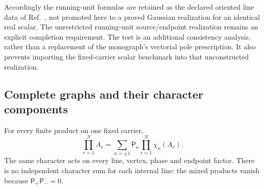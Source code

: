 \documentclass[final,5p,times,twocolumn,numbers,nopreprintline]{elsarticle}
\numberwithin{equation}{section}
\theoremstyle{definition}
\theoremstyle{remark}
\begin{document}
Accordingly the running-unit formulas are retained as the declared
oriented line data of Ref.~\cite{ChiapponeMonograph}, not promoted
here to a proved Gaussian realization for an identical real scalar.
The unrestricted running-unit source/endpoint realization remains
an explicit completion requirement. The test is an additional
consistency analysis, rather than a replacement of the monograph's
vectorial pole prescription. It also prevents importing the
fixed-carrier scalar benchmark into that unconstructed realization.

\subsection{Complete graphs and their character components}
\label{sec:graph-characters}

For every finite product on one fixed carrier,
\begin{equation}
 \prod_{r=1}^{N}A_r
  =\sum_{\kappa=\pm1}\mathsf P_{\kappa}
           \prod_{r=1}^{N}\chi_\kappa(A_r).
 \label{eq:common-character-product}
\end{equation}
The same character acts on every line, vertex, phase and endpoint
factor. There is no independent character sum for each internal
line: the mixed products vanish because
\(\mathsf P_+\mathsf P_-=0\).
\end{document}
